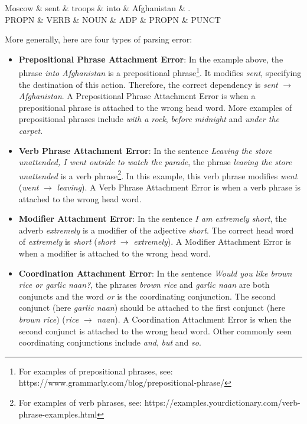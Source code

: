 \begin{parts}
\begin{center}
 {
 \begin{dependency}
 \begin{deptext}
Moscow  \& sent \& troops \& into  \& Afghanistan \& .     \\
 PROPN \& VERB  \& NOUN  \& ADP \& PROPN \& PUNCT \\
 \end{deptext}
 \end{dependency}
 }
 \end{center}

More generally, here are four types of parsing error:
\begin{itemize}
    \item \textbf{Prepositional Phrase Attachment Error}: In the example above, the phrase \textit{into Afghanistan} is a prepositional phrase\footnote{For examples of prepositional phrases, see: https://www.grammarly.com/blog/prepositional-phrase/}. It modifies \textit{sent}, specifying the destination of this action. Therefore, the correct dependency is \textit{sent} $\rightarrow$ \textit{Afghanistan}. 
    A Prepositional Phrase Attachment Error is when a prepositional phrase is attached to the wrong head word.
    More examples of prepositional phrases include \textit{with a rock}, \textit{before midnight} and \textit{under the carpet}. 
    \item \textbf{Verb Phrase Attachment Error}: In the sentence \textit{Leaving the store unattended, I went outside to watch the parade}, the phrase \textit{leaving the store unattended} is a verb phrase\footnote{For examples of verb phrases, see: https://examples.yourdictionary.com/verb-phrase-examples.html}. In this example, this verb phrase modifies \textit{went} (\textit{went} $\rightarrow$ \textit{leaving}).
    A Verb Phrase Attachment Error is when a verb phrase is attached to the wrong head word.
    \item \textbf{Modifier Attachment Error}: In the sentence \textit{I am extremely short}, the adverb \textit{extremely} is a modifier of the adjective \textit{short}. The correct head word of \textit{extremely} is \textit{short} (\textit{short} $\rightarrow$ \textit{extremely}). A Modifier Attachment Error is when a modifier is attached to the wrong head word.
    \item \textbf{Coordination Attachment Error}: In the sentence \textit{Would you like brown rice or garlic naan?}, the phrases \textit{brown rice} and \textit{garlic naan} are both conjuncts and the word \textit{or} is the coordinating conjunction. The second conjunct (here \textit{garlic naan}) should be attached to the first conjunct (here \textit{brown rice}) (\textit{rice} $\rightarrow$ \textit{naan}). A Coordination Attachment Error is when the second conjunct is attached to the wrong head word. Other commonly seen coordinating conjunctions include \textit{and}, \textit{but} and \textit{so}.

\end{itemize}
\end{parts}
